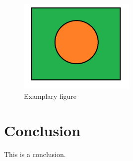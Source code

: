 \documentclass[e-only,10pt,reqno]{ofj}
\numberwithin{equation}{section}
\begin{document}
\begin{figure}
\includegraphics[width=0.5\textwidth]{example.png}
\caption{Examplary figure}
\label{fig:example}
\end{figure}


\section{Conclusion}

This is a conclusion.


%


%
%




\end{document}
